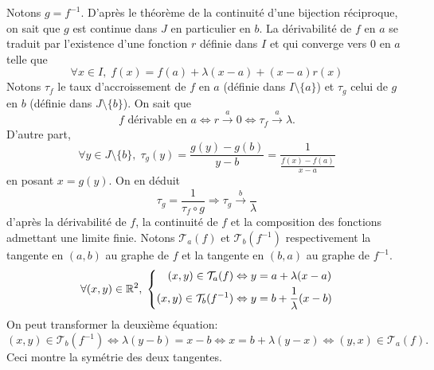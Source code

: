 \begin{demo}
Notons $g=f^{-1}$. D'après le théorème de la continuité d'une bijection réciproque, on sait que $g$ est continue dans $J$ en particulier en $b$. La dérivabilité de $f$ en $a$ se traduit par l'existence d'une fonction $r$ définie dans $I$ et qui converge vers $0$ en $a$ telle que
\[
\forall x \in I, \; f(x) = f(a) + \lambda(x-a) + (x-a)r(x) 
\]
Notons $\tau_f$ le taux d'accroissement de $f$ en $a$ (définie dans $I\setminus\{a\}$) et $\tau_g$ celui de $g$ en $b$ (définie dans $J\setminus\{b\}$). On sait que
\[
 f \text{ dérivable en } a \Leftrightarrow r\xrightarrow{a} 0 \Leftrightarrow \tau_f \xrightarrow{a} \lambda.
\]
D'autre part,
\[
 \forall y \in J\setminus\{b\},\;
 \tau_g(y) = \frac{g(y) - g(b)}{y-b}
 =\frac{1}{\frac{f(x) - f(a)}{x - a}}
\]
en posant $x=g(y)$. On en déduit 
\[
 \tau_g = \frac{1}{\tau_f \circ g} \Rightarrow \tau_g \xrightarrow{b} \frac{}{\lambda}
\]
d'après la dérivabilité de $f$, la continuité de $f$ et la composition des fonctions admettant une limite finie.\newline
Notons $\mathcal{T}_a(f)$ et $\mathcal{T}_b(f^{-1})$ respectivement la tangente en $(a,b)$ au graphe de $f$ et la tangente en $(b,a)$ au graphe de $f^{-1}$.
\[
 \forall (x,y) \in \mathbb{R}^2,\;
\left\lbrace 
\begin{aligned}
 (x,y) \in \mathcal{T}_a(f) \Leftrightarrow y &= a + \lambda(x-a) \\
 (x,y) \in \mathcal{T}_b(f^{-1}) \Leftrightarrow y &= b + \frac{1}{\lambda}(x-b) 
\end{aligned}
\right. 
\]
On peut transformer la deuxième équation:
\[
 (x,y) \in \mathcal{T}_b(f^{-1}) \Leftrightarrow \lambda(y - b) = x-b 
 \Leftrightarrow x = b +\lambda(y-x) 
 \Leftrightarrow (y,x) \in \mathcal{T}_a(f).
\]
Ceci montre la symétrie des deux tangentes.
\end{demo}

